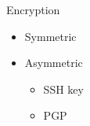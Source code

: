 \documentclass[aspectratio=169,10pt,t]{beamer}
\begin{document}
\begin{frame}[t]{Encryption}{\phantom{(y)}}
	\begin{itemize}
		\item Symmetric
			\begin{itemize}
			\end{itemize}
		\item Asymmetric 
			\begin{itemize}
				\item SSH key
				\item PGP
			\end{itemize}
	\end{itemize}
\end{frame}
\end{document}
